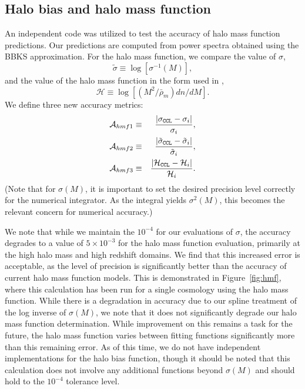 \documentclass[\docopts]{\docclass}
\begin{document}
\subsection{Halo bias and halo mass function}

An independent code was utilized to test the accuracy of halo mass function predictions. Our predictions are computed from power spectra obtained using the BBKS approximation. For the halo mass function, we compare the value of $\sigma$,
\begin{equation}
  \tilde\sigma\equiv\log[\sigma^{-1}(M)],\label{eq:tildesig}
\end{equation}
and the value of the halo mass function in the form used in \citet{Tinker2008},
\begin{equation}
  \mathcal{H}\equiv \log[(M^2/\bar{\rho}_m)dn/dM].
  \label{eq:newhmf}
\end{equation}
We define three new accuracy metrics:
\begin{eqnarray}
  \mathcal{A}_{hmf1}&\equiv&\frac{|\sigma_{\tt CCL}-\sigma_i|}{\sigma_i},\\
  \mathcal{A}_{hmf2}&\equiv&\frac{|\tilde\sigma_{\tt CCL}-\tilde\sigma_i|}{\tilde\sigma_i},\\
  \mathcal{A}_{hmf3}&\equiv&\frac{|\mathcal{H}_{\tt CCL}-\mathcal{H}_i|}{\mathcal{H}_i}.
\end{eqnarray}
(Note that for $\sigma(M)$, it is important to set the desired precision level correctly for the numerical integrator. As the integral yields $\sigma^2(M)$, this becomes the relevant concern for numerical accuracy.) 

We note that while we maintain the $10^{-4}$ for our evaluations of $\sigma$, the accuracy degrades to a value of $5\times10^{-3}$ for the halo mass function evaluation, primarily at the high halo mass and high redshift domains. We find that this increased error is acceptable, as the level of precision is significantly better than the accuracy of current halo mass function models. This is demonstrated in Figure~\ref{fig:hmf}, where this calculation has been run for a single cosmology using the \citet{Tinker2010} halo mass function. While there is a degradation in accuracy due to our spline treatment of the log inverse of $\sigma(M)$, we note that it does not significantly degrade our halo mass function determination. While improvement on this remains a task for the future, the halo mass function varies between fitting functions significantly more than this remaining error. As of this time, we do not have independent implementations for the halo bias function, though it should be noted that this calculation does not involve any additional functions beyond $\sigma(M)$ and should hold to the $10^{-4}$ tolerance level.
\end{document}
